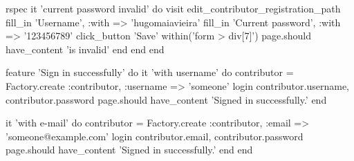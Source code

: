 \begin{mycode}{rspec}
    it 'current password invalid' do
      visit edit_contributor_registration_path
      fill_in 'Username', :with => 'hugomaiavieira'
      fill_in 'Current password', :with => '123456789'
      click_button 'Save'
      within('form > div[7]') { page.should have_content 'is invalid' }
    end
  end
end

feature 'Sign in successfully' do
  it 'with username' do
    contributor = Factory.create :contributor, :username => 'someone'
    login contributor.username, contributor.password
    page.should have_content 'Signed in successfully.'
  end

  it 'with e-mail' do
    contributor = Factory.create :contributor, :email => 'someone@example.com'
    login contributor.email, contributor.password
    page.should have_content 'Signed in successfully.'
  end
end
\end{mycode}